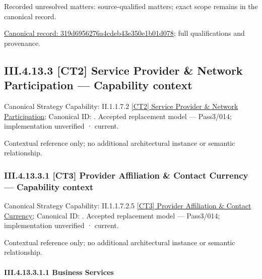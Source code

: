 {\small Recorded unresolved matters: source-qualified matters; exact scope remains in the canonical record.}\par
{\footnotesize \href{../../../../continuum/business/business-process/319d6956276a4cdeb43e350e1b01d078.md}{Canonical record: 319d6956276a4cdeb43e350e1b01d078}; full qualifications and provenance.}\par
\subsection*{III.4.13.3 [CT2] Service Provider \& Network Participation — Capability context}
\label{navigation:III.4.13.3}

{\small Canonical Strategy Capability: II.1.1.7.2 \hyperref[element:ceca5f9bdddb4a39bab531595e3547ff]{[CT2] Service Provider \& Network Participation}; Canonical ID: \texttt{}. Accepted replacement model — Pass3/014; implementation unverified · current.}\par
Contextual reference only; no additional architectural instance or semantic relationship.\par
\subsubsection*{III.4.13.3.1 [CT3] Provider Affiliation \& Contact Currency — Capability context}
\label{navigation:III.4.13.3.1}

{\small Canonical Strategy Capability: II.1.1.7.2.5 \hyperref[element:26090bfba56a4a36a7a0f4158ef04c5a]{[CT3] Provider Affiliation \& Contact Currency}; Canonical ID: \texttt{}. Accepted replacement model — Pass3/014; implementation unverified · current.}\par
Contextual reference only; no additional architectural instance or semantic relationship.\par
\paragraph*{III.4.13.3.1.1 Business Services}
\label{navigation:III.4.13.3.1.1}

